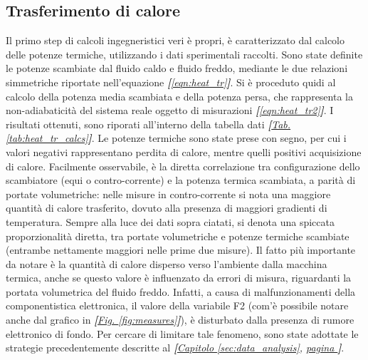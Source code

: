 \documentclass[a4paper,10pt]{article}                                                                                       %
\begin{document}
\subsection{Trasferimento di calore}                                                                                        %
\label{subsec:heat_tr}                                                                                                      %
  Il primo step di calcoli ingegneristici veri è propri, è caratterizzato dal calcolo delle potenze termiche, utilizzando i
  dati sperimentali raccolti. Sono state definite le potenze scambiate dal fluido caldo e fluido freddo, mediante le
  due relazioni simmetriche riportate nell'equazione \textit{\textbf{[}\ref{eqn:heat_tr}\textbf{]}}. Si è proceduto quidi
  al calcolo della potenza media scambiata e della potenza persa, che rappresenta la non-adiabaticità del
  sistema reale oggetto di misurazioni \textit{\textbf{[}\ref{eqn:heat_tr2}\textbf{]}}. I risultati ottenuti, sono riporati
  all'interno della tabella dati \textit{\textbf{[}\hyperref[tab:heat_tr_calcs]{Tab. }\ref{tab:heat_tr_calcs}\textbf{]}}.
  Le potenze termiche sono state prese con segno, per cui i valori negativi rappresentano perdita di calore, mentre quelli
  positivi acquisizione di calore. Facilmente osservabile, è la diretta correlazione tra configurazione dello scambiatore
  (equi o contro-corrente) e la potenza termica scambiata, a parità di portate volumetriche: nelle misure in
  contro-corrente si nota una maggiore quantità di calore trasferito, dovuto alla presenza di maggiori gradienti di
  temperatura. Sempre alla luce dei dati sopra ciatati, si denota una spiccata proporzionalità diretta, tra portate
  volumetriche e potenze termiche scambiate (entrambe nettamente maggiori nelle prime due misure). Il fatto più importante
  da notare è la quantità di calore disperso verso l'ambiente dalla macchina termica, anche se questo valore è influenzato
  da errori di misura, riguardanti la portata volumetrica del fluido freddo. Infatti, a causa di malfunzionamenti della
  componentistica elettronica, il valore della variabile F2 (com'è possibile notare anche dal grafico in
  \textit{\textbf{[}\hyperref[fig:measures]{Fig. }\ref{fig:measures}\textbf{]}}), è disturbato dalla presenza
  di rumore elettronico di fondo. Per cercare di limitare tale fenomeno, sono state adottate le strategie precedentemente
  descritte al \textit{\textbf{[}\hyperref[sec:data_analysis]{Capitolo }\ref{sec:data_analysis},
  \hyperref[sec:data_analysis]{pagina }\pageref{sec:data_analysis}\textbf{]}}. 
\end{document}
